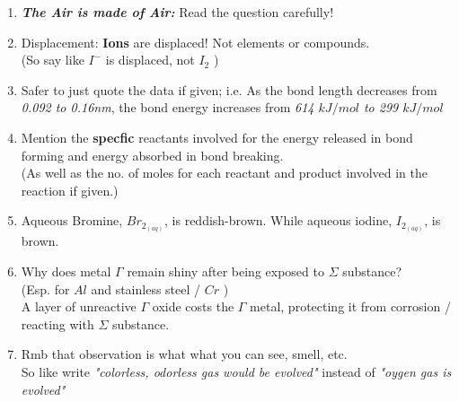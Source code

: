 \documentclass[oneside]{book}
\begin{document}

\begin{enumerate}
    \item \emph{\textbf{The Air is made of Air:}} Read the question carefully!
    \item Displacement: \textbf{Ions} are displaced! Not elements or compounds.\\ \footnotesize (So say like \(I^{-}\) is displaced, not \( I_2 \) ) \normalsize
    \item Safer to just quote the data if given; i.e. 
    \footnotesize As the bond length decreases from \emph{0.092 to 0.16nm}, the bond energy increases from \emph{614 \( kJ/mol \) to 299 \( kJ/mol \)} \normalsize
    \item Mention the \textbf{specfic} reactants involved for the energy released in bond forming and energy absorbed in bond breaking.\\
    (As well as the no. of moles for each reactant and product involved in the reaction if given.)
    \item Aqueous Bromine, \( Br_{2_{(aq)}} \), is reddish-brown. While aqueous iodine, \( I_{2_{(aq)}} \), is brown. 
    \item Why does metal \(\Gamma\) remain shiny after being exposed to \(\Sigma\) substance?\\
     \footnotesize (Esp. for \(Al\) and stainless steel / \(Cr\) ) \normalsize\\
    A layer of unreactive \(\Gamma\) oxide costs the \(\Gamma\) metal, protecting it from corrosion / reacting with \(\Sigma\) substance.
    \item Rmb that observation is what what you can see, smell, etc.\\ 
    \footnotesize So like write \emph{"colorless, odorless gas would be evolved"} instead of \emph{"oygen gas is evolved"} \normalsize

\end{enumerate}
\end{document}
